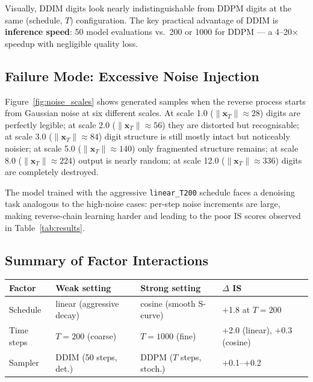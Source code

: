 \documentclass[11pt,a4paper]{article}
\begin{document}
Visually, DDIM digits look nearly indistinguishable from DDPM digits at the
same (schedule, $T$) configuration.  The key practical advantage of DDIM is
\textbf{inference speed}: 50 model evaluations vs.\ 200 or 1000 for DDPM
--- a 4–20$\times$ speedup with negligible quality loss.

\subsection{Failure Mode: Excessive Noise Injection}

Figure~\ref{fig:noise_scales} shows generated samples when the reverse
process starts from Gaussian noise at six different scales.
At scale 1.0 ($\|\mathbf{x}_T\|\approx 28$) digits are perfectly legible; at
scale 2.0 ($\|\mathbf{x}_T\|\approx 56$) they are distorted but recognisable;
at scale 3.0 ($\|\mathbf{x}_T\|\approx 84$) digit structure is still mostly
intact but noticeably noisier; at scale 5.0 ($\|\mathbf{x}_T\|\approx 140$)
only fragmented structure remains; at scale 8.0 ($\|\mathbf{x}_T\|\approx 224$)
output is nearly random; at scale 12.0 ($\|\mathbf{x}_T\|\approx 336$) digits
are completely destroyed.

The model trained with the aggressive \texttt{linear\_T200} schedule faces a
denoising task analogous to the high-noise cases: per-step noise increments are
large, making reverse-chain learning harder and leading to the poor IS scores
observed in Table~\ref{tab:results}.

\subsection{Summary of Factor Interactions}

\begin{center}
\begin{tabular}{llll}
\toprule
\textbf{Factor} & \textbf{Weak setting} & \textbf{Strong setting} & \boldmath$\Delta$ IS\\
\midrule
Schedule   & linear (aggressive decay) & cosine (smooth S-curve) & $+$1.8 at $T=200$\\
Time steps & $T=200$ (coarse)          & $T=1000$ (fine)         & $+$2.0 (linear), $+$0.3 (cosine)\\
Sampler    & DDIM (50 steps, det.)     & DDPM ($T$ steps, stoch.) & $+$0.1–$+$0.2\\
\bottomrule
\end{tabular}
\end{center}
\end{document}
